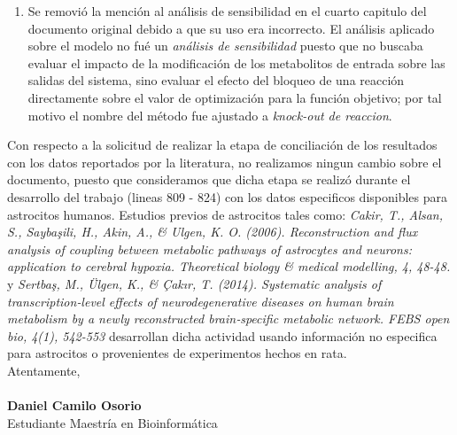 \documentclass[12pt,a4paper]{article}
\begin{document}
\begin{enumerate}
\item Se removió la mención al análisis de sensibilidad en el cuarto capitulo del documento original debido a que su uso era incorrecto. El análisis aplicado sobre el modelo no fué un \emph{análisis de sensibilidad} puesto que no buscaba evaluar el impacto de la modificación de los metabolitos de entrada sobre las salidas del sistema, sino evaluar el efecto del bloqueo de una reacción directamente sobre el valor de optimización para la función objetivo; por tal motivo el nombre del método fue ajustado a \emph{knock-out de reaccion}.
\end{enumerate}

Con respecto a la solicitud de realizar la etapa de conciliación de los resultados con los datos reportados por la literatura, no realizamos ningun cambio sobre el documento, puesto que consideramos que dicha etapa se realizó durante el desarrollo del trabajo (lineas 809 - 824) con los datos especificos disponibles para astrocitos humanos. Estudios previos de astrocitos tales como: \emph{Cakir, T., Alsan, S., Saybaşili, H., Akin, A., \& Ulgen, K. O. (2006). Reconstruction and flux analysis of coupling between metabolic pathways of astrocytes and neurons: application to cerebral hypoxia. Theoretical biology \& medical modelling, 4, 48-48.}  y \emph{Sertbaş, M., Ülgen, K., \& Çakır, T. (2014). Systematic analysis of transcription‐level effects of neurodegenerative diseases on human brain metabolism by a newly reconstructed brain‐specific metabolic network. FEBS open bio, 4(1), 542-553} desarrollan dicha actividad usando información no especifica para astrocitos o provenientes de experimentos hechos en rata.\\


\noindent Atentamente,\\
\\
\textbf{Daniel Camilo Osorio}\\
Estudiante Maestría en Bioinformática
\end{document}
